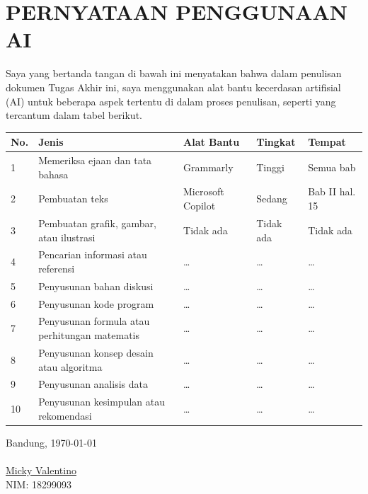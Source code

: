 \chapter*{PERNYATAAN PENGGUNAAN AI}
Saya yang bertanda tangan di bawah ini menyatakan bahwa dalam penulisan dokumen Tugas Akhir ini,
saya menggunakan alat bantu kecerdasan artifisial (AI) untuk beberapa aspek tertentu di dalam proses penulisan,
seperti yang tercantum dalam tabel berikut.
\begin{table}[h]
\begin{tabular}{|p{0.5cm}| p{4cm} | p{2.5cm} | p{2.5cm} | p{3cm} @{}| }
\hline
\textbf{No.} & \textbf{Jenis} & \textbf{Alat Bantu} & \textbf{Tingkat} & \textbf{Tempat}\\
\hline
1 & Memeriksa ejaan dan tata bahasa & Grammarly & Tinggi & Semua bab \\
\hline
2 & Pembuatan teks & Microsoft Copilot & Sedang & Bab II hal. 15 \\
\hline
3 & Pembuatan grafik, gambar, atau ilustrasi & Tidak ada & Tidak ada & Tidak ada \\
\hline
4 & Pencarian informasi atau referensi & \ldots & \ldots & \ldots \\
\hline
5 & Penyusunan bahan diskusi & \ldots & \ldots & \ldots \\
\hline
6 & Penyusunan kode program & \ldots & \ldots & \ldots \\
\hline
7 & Penyusunan formula atau perhitungan matematis & \ldots & \ldots & \ldots \\
\hline
8 & Penyusunan konsep desain atau algoritma & \ldots & \ldots & \ldots \\
\hline
9 & Penyusunan analisis data & \ldots & \ldots & \ldots \\
\hline
10 & Penyusunan kesimpulan atau rekomendasi & \ldots & \ldots & \ldots \\
\hline
\end{tabular}
\end{table}


Bandung, \today\\
\\[2cm]

\underline{Micky Valentino} \\
NIM: 18299093